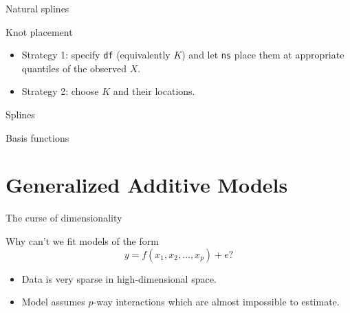 \documentclass[14pt]{beamer}
\begin{document}
\begin{frame}{Natural splines}

\end{frame}

\begin{frame}[fragile]{Knot placement}

\begin{itemize}
\item Strategy 1: specify \verb|df| (equivalently $K$) and let \verb|ns| place them at appropriate quantiles of the observed $X$.

\item Strategy 2: choose $K$ and their locations.
\end{itemize}

\end{frame}

\begin{frame}{Splines}
\end{frame}

\begin{frame}{Basis functions}
\end{frame}


\section{Generalized Additive Models}


\begin{frame}{The curse of dimensionality}

Why can't we fit models of the form
$$y = f(x_1,x_2,\dots,x_p) + e?$$\pause

\begin{itemize}
\item Data is very sparse in high-dimensional space.
\item Model assumes $p$-way interactions which are almost impossible to estimate.
\end{itemize}
\end{frame}
\end{document}
